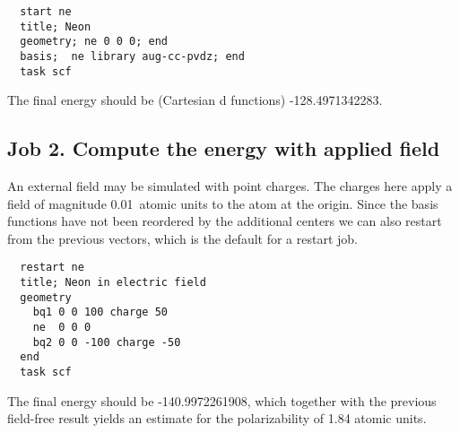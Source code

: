 \begin{verbatim}
  start ne
  title; Neon
  geometry; ne 0 0 0; end
  basis;  ne library aug-cc-pvdz; end
  task scf
\end{verbatim}

The final energy should be (Cartesian d functions) -128.4971342283.

\subsection{Job 2. Compute the energy with applied field}

An external field may be simulated with point charges.  The charges
here apply a field of magnitude 0.01\ atomic units to the atom at the
origin.  Since the basis functions have not been reordered by the
additional centers we can also restart from the previous vectors,
which is the default for a restart job.

\begin{verbatim}
  restart ne
  title; Neon in electric field
  geometry
    bq1 0 0 100 charge 50
    ne  0 0 0
    bq2 0 0 -100 charge -50
  end
  task scf
\end{verbatim}

The final energy should be -140.9972261908, which together with the
previous field-free result yields an estimate for the polarizability
of 1.84 atomic units.
